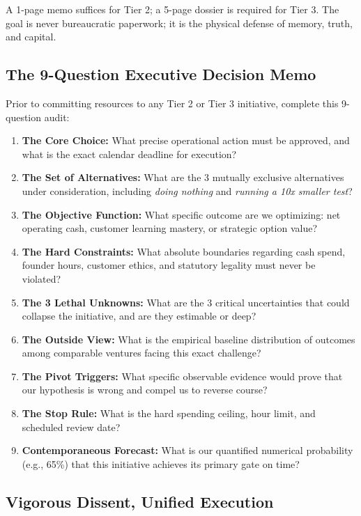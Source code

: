 A 1-page memo suffices for Tier 2; a 5-page dossier is required for Tier 3. The goal is never bureaucratic paperwork; it is the physical defense of memory, truth, and capital.

\subsection{The 9-Question Executive Decision Memo}

Prior to committing resources to any Tier 2 or Tier 3 initiative, complete this 9-question audit:

\begin{enumerate}[leftmargin=12pt,itemsep=2pt,topsep=1pt,parsep=0pt]
  \item \textbf{The Core Choice:} What precise operational action must be approved, and what is the exact calendar deadline for execution?
  \item \textbf{The Set of Alternatives:} What are the 3 mutually exclusive alternatives under consideration, including \textit{doing nothing} and \textit{running a 10x smaller test}?
  \item \textbf{The Objective Function:} What specific outcome are we optimizing: net operating cash, customer learning mastery, or strategic option value?
  \item \textbf{The Hard Constraints:} What absolute boundaries regarding cash spend, founder hours, customer ethics, and statutory legality must never be violated?
  \item \textbf{The 3 Lethal Unknowns:} What are the 3 critical uncertainties that could collapse the initiative, and are they estimable or deep?
  \item \textbf{The Outside View:} What is the empirical baseline distribution of outcomes among comparable ventures facing this exact challenge?
  \item \textbf{The Pivot Triggers:} What specific observable evidence would prove that our hypothesis is wrong and compel us to reverse course?
  \item \textbf{The Stop Rule:} What is the hard spending ceiling, hour limit, and scheduled review date?
  \item \textbf{Contemporaneous Forecast:} What is our quantified numerical probability (e.g., 65\%) that this initiative achieves its primary gate on time?
\end{enumerate}

\subsection{Vigorous Dissent, Unified Execution}

